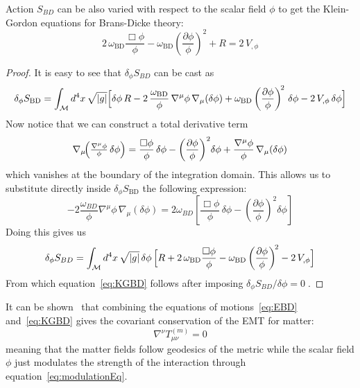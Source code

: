 Action $S_{BD}$ can be also varied with respect to the scalar field $\phi$ to get the Klein-Gordon equations for Brans-Dicke theory:
\begin{equation}\label{eq:KGBD}
    2\,\omega_{\mathrm{BD}}\frac{\Box\phi}{\phi}
    - \omega_{\mathrm{BD}}
      \left(\frac{\partial\phi}{\phi}\right)^{\!2}
    + R = 2\,V_{,\phi}
\end{equation}
\begin{proof}
    It is easy to see that $\delta_\phi S_{BD}$ can be cast as
\begin{equation*}
    \delta_\phi S_{\mathrm{BD}}
      = \int_{\mathcal{M}} d^{4}x\,\sqrt{|g|}
         \Bigl[ \delta\phi\,R
            - 2\,\frac{\omega_{\mathrm{BD}}}{\phi}\,
              \nabla^{\mu}\phi\,\nabla_{\mu}(\delta\phi)
            + \omega_{\mathrm{BD}}
              \left(\frac{\partial\phi}{\phi}\right)^{\!2}\,\delta\phi
            - 2\,V_{,\phi}\,\delta\phi\Bigr]
\end{equation*}
Now notice that we can construct a total derivative term
\begin{equation*}
        \nabla_\mu\!\Bigl(\tfrac{\nabla^{\mu}\phi}{\phi}\,\delta\phi\Bigr)
           = \frac{\Box\phi}{\phi}\,\delta\phi
             - \left(\frac{\partial\phi}{\phi}\right)^{2}\!\delta\phi
             + \frac{\nabla^{\mu}\phi}{\phi}\,\nabla_{\mu}(\delta\phi)
\end{equation*}
which vanishes at the boundary of the integration domain. This allows us to substitute directly inside $\delta_\phi S_{\mathrm{BD}}$ the following expression:
\begin{equation*}
    -2 \frac{\omega_{BD}}{\phi}\nabla^{\mu}\phi\,\nabla_{\mu}(\delta\phi) = 2 \omega_{BD} \left[\frac{\Box\phi}{\phi}\,\delta\phi
    - \left(\frac{\partial\phi}{\phi}\right)^{2}\!\delta\phi\right]
\end{equation*}
Doing this gives us 
\begin{equation*}
    \delta_\phi S_{BD}
      = \int_{\mathcal{M}} d^{4}x\,\sqrt{|g|}\,\delta\phi\,
         \Bigl[
            R
            + 2\,\omega_{\mathrm{BD}}\frac{\Box\phi}{\phi}
            - \omega_{\mathrm{BD}}
              \left(\frac{\partial\phi}{\phi}\right)^{\!2}
            - 2\,V_{,\phi}
         \Bigr]
\end{equation*}
From which equation~\eqref{eq:KGBD} follows after imposing $\delta_\phi S_{BD}/\delta \phi = 0\;$.
\end{proof}
    
It can be shown~\cite{Quiros:2019ktw} that combining the equations of motions~\eqref{eq:EBD} and~\eqref{eq:KGBD} gives the covariant conservation
of the EMT for matter:
\begin{equation}
  \nabla^{\nu}T_{\mu\nu}^{(m)}= 0
\end{equation} 
meaning that the matter fields follow geodesics of the metric while the scalar field $\phi$ just modulates the strength of the interaction through equation~\eqref{eq:modulationEq}.

